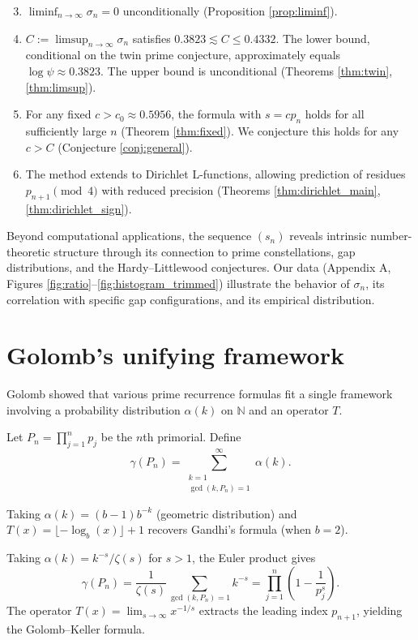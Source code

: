 \documentclass[12pt]{article}
\theoremstyle{plain}
\theoremstyle{definition}
\theoremstyle{remark}
\begin{document}
\begin{enumerate}
\setcounter{enumi}{2}
\item $\liminf_{n \to \infty} \sigma_n = 0$ unconditionally (Proposition \ref{prop:liminf}).
\item $C := \limsup_{n \to \infty} \sigma_n$ satisfies $0.3823 \lesssim C \leq 0.4332$. The lower bound, conditional on the twin prime conjecture, approximately equals $\log \psi \approx 0.3823$. The upper bound is unconditional (Theorems \ref{thm:twin}, \ref{thm:limsup}).
\item For any fixed $c > c_0 \approx 0.5956$, the formula with $s = cp_n$ holds for all sufficiently large $n$ (Theorem \ref{thm:fixed}). We conjecture this holds for any $c > C$ (Conjecture \ref{conj:general}).
\item The method extends to Dirichlet L-functions, allowing prediction of residues $p_{n+1} \pmod 4$ with reduced precision (Theorems \ref{thm:dirichlet_main}, \ref{thm:dirichlet_sign}).
\end{enumerate}

Beyond computational applications, the sequence $(s_n)$ reveals intrinsic number-theoretic structure through its connection to prime constellations, gap distributions, and the Hardy--Littlewood conjectures. Our data (Appendix A, Figures \ref{fig:ratio}--\ref{fig:histogram_trimmed}) illustrate the behavior of $\sigma_n$, its correlation with specific gap configurations, and its empirical distribution.

\section{Golomb's unifying framework}

Golomb \cite{Golomb1976} showed that various prime recurrence formulas fit a single framework involving a probability distribution $\alpha(k)$ on $\mathbb{N}$ and an operator $T$.

Let $P_n = \prod_{j=1}^{n} p_j$ be the $n$th primorial. Define
\[
\gamma(P_n) = \sum_{\substack{k=1 \\ \gcd(k,P_n)=1}}^\infty \alpha(k).
\]

Taking $\alpha(k) = (b-1)b^{-k}$ (geometric distribution) and $T(x) = \lfloor -\log_b(x) \rfloor + 1$ recovers Gandhi's formula (when $b=2$).

Taking $\alpha(k) = k^{-s}/\zeta(s)$ for $s>1$, the Euler product gives
\[
\gamma(P_n) = \frac{1}{\zeta(s)} \sum_{\gcd(k,P_n)=1} k^{-s} = \prod_{j=1}^n \left(1 - \frac{1}{p_j^s}\right).
\]
The operator $T(x) = \lim_{s\to\infty} x^{-1/s}$ extracts the leading index $p_{n+1}$, yielding the Golomb--Keller formula.
\end{document}

